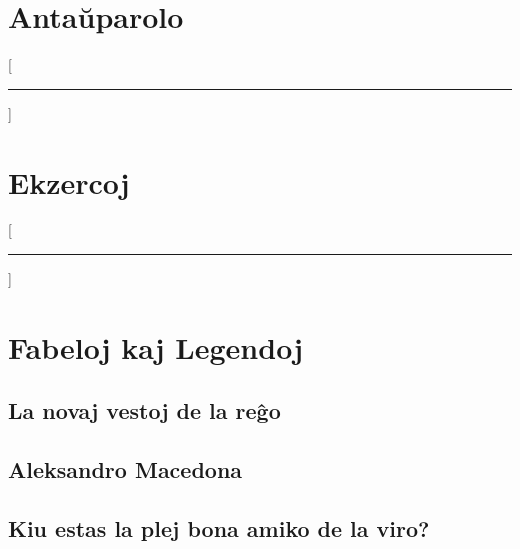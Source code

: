 \documentclass[a5paper,11pt,openany,twoside]{book}
\begin{document}
%
%
\chapter*{Anta\u uparolo}
\thispagestyle{empty}
\fancyhead[LE,RO]{\footnotesize\thepage}
\fancyhead[CE]{\footnotesize\leftmark}
\fancyhead[CO]{\footnotesize\rightmark}
\label{antau}


%
%
\mainmatter
{}[{\rule{13mm}{0.4pt}}]
\chapter{Ekzercoj}
\label{ekzercoj}


%
%
\titleformat{\chapter}[display]{\filcenter\Large}{\thechapter}{1ex}{\MakeUppercase}[{\rule{13mm}{0.4pt}}]
\chapter{Fabeloj kaj Legendoj}
\section{La novaj vestoj de la re\^go}
\label{novajvestoj}


\section{Aleksandro Macedona}
\label{aleksandro}


\section{Kiu estas la plej bona amiko de la viro?}
\label{plejbona}

\end{document}
